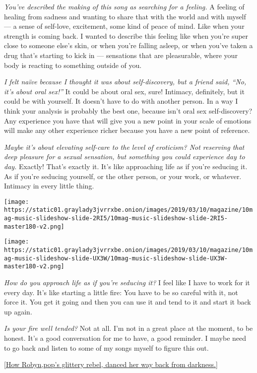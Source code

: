 \emph{You've described the making of this song as searching for a
feeling.} A feeling of healing from sadness and wanting to share that
with the world and with myself --- a sense of self-love, excitement,
some kind of peace of mind. Like when your strength is coming back. I
wanted to describe this feeling like when you're super close to someone
else's skin, or when you're falling asleep, or when you've taken a drug
that's starting to kick in --- sensations that are pleasurable, where
your body is reacting to something outside of you.

\emph{I felt naïve because I thought it was about self-discovery, but a
friend said, ``No, it's about oral sex!''} It could be about oral sex,
sure! Intimacy, definitely, but it could be with yourself. It doesn't
have to do with another person. In a way I think your analysis is
probably the best one, because isn't oral sex self-discovery? Any
experience you have that will give you a new point in your scale of
emotions will make any other experience richer because you have a new
point of reference.

\emph{Maybe it's about elevating self-care to the level of eroticism?
Not reserving that deep pleasure for a sexual sensation, but something
you could experience day to day.} Exactly! That's exactly it. It's like
approaching life as if you're seducing it. As if you're seducing
yourself, or the other person, or your work, or whatever. Intimacy in
every little thing.

\texttt{[image: https://static01.graylady3jvrrxbe.onion/images/2019/03/10/magazine/10mag-music-slideshow-slide-2RI5/10mag-music-slideshow-slide-2RI5-master180-v2.png]}

\texttt{[image: https://static01.graylady3jvrrxbe.onion/images/2019/03/10/magazine/10mag-music-slideshow-slide-UX3W/10mag-music-slideshow-slide-UX3W-master180-v2.png]}

\emph{How do you approach life as if you're seducing it?} I feel like I
have to work for it every day. It's like starting a little fire: You
have to be so careful with it, not force it. You get it going and then
you can use it and tend to it and start it back up again.

\emph{Is your fire well tended?} Not at all. I'm not in a great place at
the moment, to be honest. It's a good conversation for me to have, a
good reminder. I maybe need to go back and listen to some of my songs
myself to figure this out.

{[}\href{https://www.nytimes3xbfgragh.onion/2018/09/21/arts/music/robyn-honey-interview.html}{How
Robyn,}\href{https://www.nytimes3xbfgragh.onion/2018/09/21/arts/music/robyn-honey-interview.html}{pop's
glittery rebel, danced her way back from darkness.}{]}

